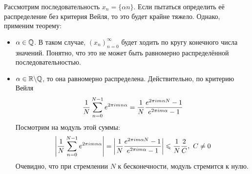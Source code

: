 \begin{example}
	Рассмотрим последовательность $x_n = \{\alpha n\}$. Если пытаться определить её распределение без критерия Вейля, то это будет крайне тяжело. Однако, применим теорему:
	\begin{itemize}
		\item $\alpha \in \mathbb{Q}$. В таком случае, $(x_n)_{n = 0}^\infty$ будет ходить по кругу конечного числа значений. Понятно, что это не может быть равномерно распределённой последовательностью.
		
		\item $\alpha \in \mathbb{R} \backslash \mathbb{Q}$, то она равномерно распределена. Действительно, по критерию Вейля
		\[
			\frac{1}{N} \sum\limits_{n = 0}^{N - 1} e^{2 \pi im n\alpha} = \frac{1}{N} \frac{e^{2\pi im \alpha N} - 1}{e^{2\pi im \alpha} - 1}
		\]
		Посмотрим на модуль этой суммы:
		\[
			\left|\frac{1}{N} \sum\limits_{n = 0}^{N - 1} e^{2 \pi im n\alpha}\right| = \left|\frac{1}{N} \frac{e^{2\pi im \alpha N} - 1}{e^{2\pi im \alpha} - 1}\right| \leqslant \frac{1}{N} \frac{2}{C},\ C \neq 0
		\]
		Очевидно, что при стремлении $N$ к бесконечности, модуль стремится к нулю.
	\end{itemize}
\end{example}